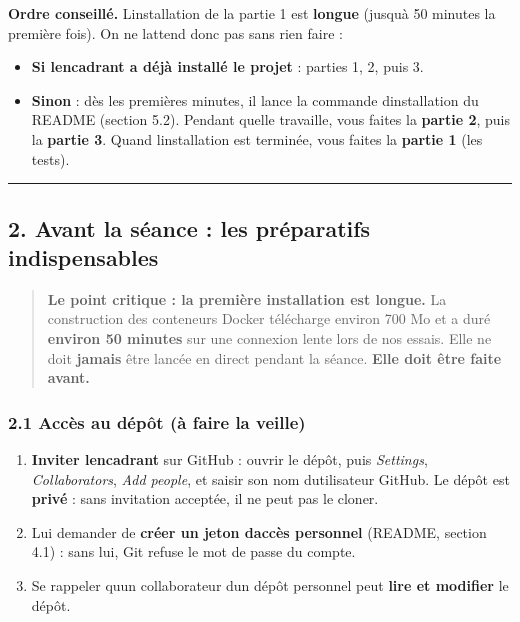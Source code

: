 \documentclass[
  french,
  11pt,
  a4paper,
]{article}
\providecommand{\tightlist}{%
  \setlength{\itemsep}{0pt}\setlength{\parskip}{0pt}}
\begin{document}
\textbf{Ordre conseillé.} L\textquotesingle installation de la partie 1
est \textbf{longue} (jusqu\textquotesingle à 50 minutes la première
fois). On ne l\textquotesingle attend donc pas sans rien faire :

\begin{itemize}
\tightlist
\item
  \textbf{Si l\textquotesingle encadrant a déjà installé le projet} :
  parties 1, 2, puis 3.
\item
  \textbf{Sinon} : dès les premières minutes, il lance la commande
  d\textquotesingle installation du README (section 5.2). Pendant
  qu\textquotesingle elle travaille, vous faites la \textbf{partie 2},
  puis la \textbf{partie 3}. Quand l\textquotesingle installation est
  terminée, vous faites la \textbf{partie 1} (les tests).
\end{itemize}

\begin{center}\rule{0.5\linewidth}{0.5pt}\end{center}

\subsection{2. Avant la séance : les préparatifs
indispensables}\label{2-avant-la-suxe9ance--les-pruxe9paratifs-indispensables}

\begin{quote}
\textbf{Le point critique : la première installation est longue.} La
construction des conteneurs Docker télécharge environ 700 Mo et a duré
\textbf{environ 50 minutes} sur une connexion lente lors de nos essais.
Elle ne doit \textbf{jamais} être lancée en direct pendant la séance.
\textbf{Elle doit être faite avant.}
\end{quote}

\subsubsection{2.1 Accès au dépôt (à faire la
veille)}\label{21-accuxe8s-au-duxe9puxf4t-uxe0-faire-la-veille}

\begin{enumerate}
\def\labelenumi{\arabic{enumi}.}
\tightlist
\item
  \textbf{Inviter l\textquotesingle encadrant} sur GitHub : ouvrir le
  dépôt, puis \emph{Settings}, \emph{Collaborators}, \emph{Add people},
  et saisir son nom d\textquotesingle utilisateur GitHub. Le dépôt est
  \textbf{privé} : sans invitation acceptée, il ne peut pas le cloner.
\item
  Lui demander de \textbf{créer un jeton d\textquotesingle accès
  personnel} (README, section 4.1) : sans lui, Git refuse le mot de
  passe du compte.
\item
  Se rappeler qu\textquotesingle un collaborateur d\textquotesingle un
  dépôt personnel peut \textbf{lire et modifier} le dépôt.
\end{enumerate}
\end{document}
